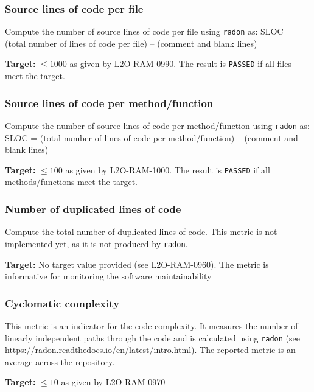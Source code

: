 
\subsubsection{Source lines of code per file}

Compute the number of source lines of code per file using \texttt{radon} as: SLOC = (total number of lines of code per file) – (comment and blank lines)

\textbf{Target:} $\leq 1000$ as given by L2O-RAM-0990. The result is \texttt{PASSED} if all files meet the target.


\subsubsection{Source lines of code per method/function}

Compute the number of source lines of code per method/function using \texttt{radon} as: SLOC = (total number of lines of code per method/function) – (comment and blank lines)

\textbf{Target:} $\leq 100$ as given by L2O-RAM-1000. The result is \texttt{PASSED} if all methods/functions meet the target.


\subsubsection{Number of duplicated lines of code}

Compute the total number of duplicated lines of code. This metric is not implemented yet, as it is not produced by \texttt{radon}.

\textbf{Target:} No target value provided (see L2O-RAM-0960). The metric is informative for monitoring the software maintainability


\subsubsection{Cyclomatic complexity}

This metric is an indicator for the code complexity. It measures the number of linearly independent paths through the code and is calculated using \texttt{radon} (see \url{https://radon.readthedocs.io/en/latest/intro.html}). The reported metric is an average across the repository.

\textbf{Target:} $\leq 10$ as given by L2O-RAM-0970

